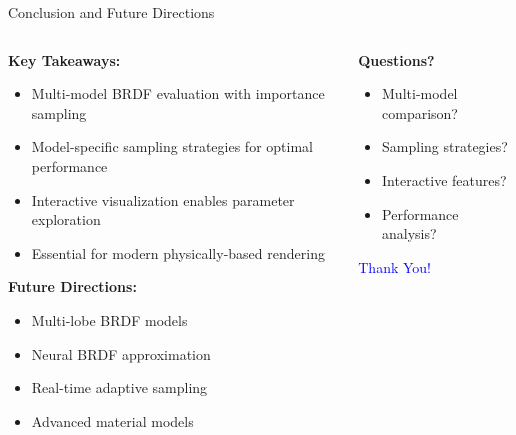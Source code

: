 \documentclass[aspectratio=169]{beamer}
\begin{document}
\begin{frame}{Conclusion and Future Directions}
    \begin{columns}
        \begin{column}{0.6\textwidth}
            \textbf{Key Takeaways:}
            \begin{itemize}
                \item<1-> Multi-model BRDF evaluation with importance sampling
                \item<2-> Model-specific sampling strategies for optimal performance
                \item<3-> Interactive visualization enables parameter exploration
                \item<4-> Essential for modern physically-based rendering
            \end{itemize}
            
            \vspace{0.5cm}
            \textbf{Future Directions:}
            \begin{itemize}
                \item Multi-lobe BRDF models
                \item Neural BRDF approximation
                \item Real-time adaptive sampling
                \item Advanced material models
            \end{itemize}
        \end{column}
        \begin{column}{0.4\textwidth}
            \textbf{Questions?}
            \begin{itemize}
                \item Multi-model comparison?
                \item Sampling strategies?
                \item Interactive features?
                \item Performance analysis?
            \end{itemize}
            
            \vspace{1cm}
            \begin{center}
                \textcolor{blue}{\large Thank You!}
            \end{center}
        \end{column}
    \end{columns}
    

\end{frame}
\end{document}

